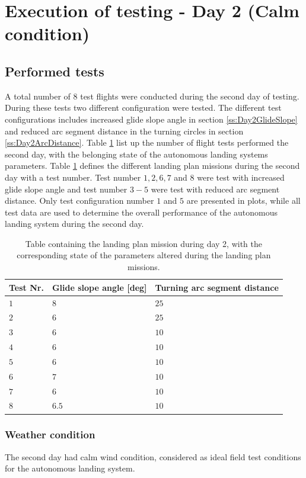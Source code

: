 \section{Execution of testing - Day 2 (Calm condition)}
\subsection{Performed tests}
A total number of 8 test flights were conducted during the second day of testing. During these tests two different configuration were tested. The different test configurations includes increased glide slope angle in section \ref{ss:Day2GlideSlope} and reduced arc segment distance in the turning circles in section \ref{ss:Day2ArcDistance}. Table \ref{tb:Day2ParameterAlteration} list up the number of flight tests performed the second day, with the belonging state of the autonomous landing systems parameters. Table \ref{tb:Day2ParameterAlteration} defines the different landing plan missions during the second day with a test number. Test number $1,2,6,7$ and $8$ were test with increased glide slope angle and test number $3-5$ were test with reduced arc segment distance. Only test configuration number $1$ and $5$ are presented in plots, while all test data are used to determine the overall performance of the autonomous landing system during the second day.
\begin{table}[H]
\begin{tabular}{| p{0.5cm} | p{3cm} | p{4cm} |}
\hline
\textbf{Test Nr.} & \textbf{Glide slope angle [deg]} &  \textbf{Turning arc segment distance}\\ \hline
$1$				& $8$ & $ 25 $		\\ \hline
$2$				& $6$ & $ 25 $		\\ \hline
$3$				& $6$ & $ 10 $		\\ \hline
$4$				& $6$ & $ 10 $		\\ \hline
$5$				& $6$ & $ 10 $			\\ \hline
$6$				& $7$ & $ 10 $		\\ \hline
$7$				& $6$ & $ 10 $			\\ \hline
$8$				& $6.5$ & $ 10 $	\\ \hline
\end{tabular}
\caption{Table containing the landing plan mission during day 2, with the corresponding state of the parameters altered during the landing plan missions.}
\label{tb:Day2ParameterAlteration}
\end{table}
\subsubsection{Weather condition}
The second day had calm wind condition, considered as ideal field test conditions for the autonomous landing system.
